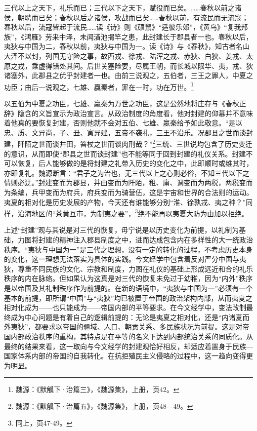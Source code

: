 \documentclass[a4paper, 12pt, openright]{ctexbook}
\renewenvironment{quote}
  {\list{}{\rightmargin2\ccwd \leftmargin2\ccwd \itemindent=2\ccwd \listparindent=2\ccwd}%
   \item\relax\small\kaishu\color{black}}
  {\endlist}
\begin{document}
\begin{quote}
三代以上之天下，礼乐而已；三代以下之天下，赋役而已矣。……春秋以前之诸侯，朝聘而已矣；春秋以后之诸侯，攻战而已矣……春秋以前，有流民而无流寇；春秋以后，流寇皆起于流民……读《诗》则《硕鼠》“适彼乐郊”，《黄鸟》“复我邦族”，《鸿雁》劳来中泽，未闻潢池揭竿之患，此封建长于郡县者一也。春秋以后，夷狄与中国为二，春秋以前，夷狄与中国为一。读《诗》与《春秋》，知古者名山大泽不以封，列国无守险之事，故西戎、徐戎、陆浑之戎、赤狄、白狄、姜戎、太原之戎，乘虚得错处其间。后世关塞险要，尽属王朝，而长城以限华、夷，戎、狄诸塞外，此郡县之优乎封建者一也。由前三说观之，五伯者，三王之罪人，中夏之功臣；由后一说观之，七雄、嬴秦者，罪在一时，功在万世。\footnote{魏源：《默觚下·治篇三》，《魏源集》，上册，页42。}
\end{quote}

以五伯为中夏之功臣，七雄、嬴秦为万世之功臣，这是公然地将庄存与《春秋正辞》隐含的义旨宣示为政治宣言。从政治制度的角度看，他对封建的仰慕并不意味着他真的要恢复封建，否则他就不会对五伯、七雄、嬴秦给予如此敬意。“是以忠、质、文异尚，子、丑、寅异建，五帝不袭礼，三王不沿乐。况郡县之世而谈封建，阡陌之世而谈井田，笞杖之世而谈肉刑哉？”\footnote{魏源：《默觚下·治篇五》，《魏源集》，上册，页48—49。}三统、三世说均包含了历史变迁的意识，从而即使“郡县之世而谈封建”也不能等同于回到封建的礼仪关系。封建不可以恢复，后人能够做的是将封建之礼带入历史的变化之中，此即顺时或维其时，亦即复礼。魏源断言：“君子之为治也，无三代以上之心则必俗，不知三代以下之情则必迂。”封建变而为郡县，并由变而为阡陌，租、庸、调变而为两税，两税变而为条编，兵甲变而为府兵，府兵变而为骑营伍，这是宇宙和世界的合法则的运动。夷夏的相对化是历史发展的产物，今天还有谁能够分别“淮、徐孰戎、夷之种？”同样，沿海地区的“茶黄互市，为制夷之要”，\footnote{同上，页47-49。}绝不能再以夷夏大防为由加以拒绝。

上述“封建”观与其说是对三代的恢复，毋宁说是以历史变化为前提，以礼制为基础，力图将封建的精神注入郡县制度之中，进而达成包含内在多样性的大一统政治秩序。“夷狄与中国为一”是三代之理想，没有一定的转化的过程，不考虑历史本身的变化，这一理想无法落实为具体的实践。今文经学中包含着反对严分中国与夷狄，尊重不同民族的文化、宗教和制度，力图在礼仪的基础上形成远近和合的礼乐秩序的内在脉络。但如果认为这真是对三代的恢复未免过于幼稚，因为“内外”秩序是以帝国及其礼制秩序作为前提的。在新的语境中，“夷狄与中国为一”必须有一个基本的前提，即所谓“中国”与“夷狄”均已被置于帝国的政治架构内部，从而夷夏之相对化成为——也只能成为——帝国内部的平等要求。在今文经学中，变法改制最终成为中心问题是有着自己的逻辑前提的：无论是夷夏之相对化，还是“内诸夏而外夷狄”，都要求以帝国的疆域、人口、朝贡关系、多民族状况为前提。这是对帝国内部政治秩序的重构，其特点是在平等的名义下达到内部统治关系的同质化。从最终的结果来看，这一取向与今文经学的封建观恰好相反，却适应着置身于民族—国家体系内部的帝国的自我转化。在抗拒殖民主义侵略的过程中，这一趋向变得更为明显。
\end{document}
